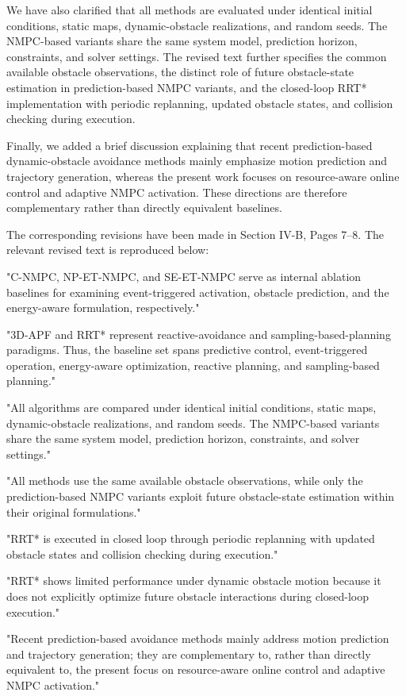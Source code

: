 \documentclass[12pt, twosides]{article}
\theoremstyle{definition}
\begin{document}
We have also clarified that all methods are evaluated under identical initial conditions, static maps, dynamic-obstacle realizations, and random seeds. The NMPC-based variants share the same system model, prediction horizon, constraints, and solver settings. The revised text further specifies the common available obstacle observations, the distinct role of future obstacle-state estimation in prediction-based NMPC variants, and the closed-loop RRT* implementation with periodic replanning, updated obstacle states, and collision checking during execution.

Finally, we added a brief discussion explaining that recent prediction-based dynamic-obstacle avoidance methods mainly emphasize motion prediction and trajectory generation, whereas the present work focuses on resource-aware online control and adaptive NMPC activation. These directions are therefore complementary rather than directly equivalent baselines.

The corresponding revisions have been made in Section IV-B, Pages 7--8. The relevant revised text is reproduced below:

"C-NMPC, NP-ET-NMPC, and SE-ET-NMPC serve as internal ablation baselines for examining event-triggered activation, obstacle prediction, and the energy-aware formulation, respectively."

"3D-APF and RRT* represent reactive-avoidance and sampling-based-planning paradigms. Thus, the baseline set spans predictive control, event-triggered operation, energy-aware optimization, reactive planning, and sampling-based planning."

"All algorithms are compared under identical initial conditions, static maps, dynamic-obstacle realizations, and random seeds. The NMPC-based variants share the same system model, prediction horizon, constraints, and solver settings."

"All methods use the same available obstacle observations, while only the prediction-based NMPC variants exploit future obstacle-state estimation within their original formulations."

"RRT* is executed in closed loop through periodic replanning with updated obstacle states and collision checking during execution."

"RRT* shows limited performance under dynamic obstacle motion because it does not explicitly optimize future obstacle interactions during closed-loop execution."

"Recent prediction-based avoidance methods mainly address motion prediction and trajectory generation; they are complementary to, rather than directly equivalent to, the present focus on resource-aware online control and adaptive NMPC activation."
\end{document}
